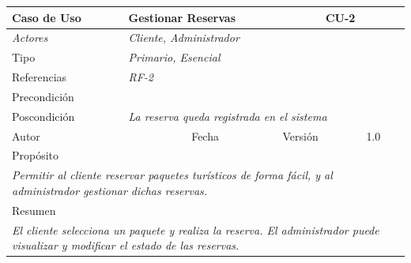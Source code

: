 \begin{table}[H]
\begin{tabular}{|llllllll|}
\hline
\multicolumn{1}{|l|}{\cellcolor[HTML]{F2F2F2}Caso de Uso} & \multicolumn{5}{l|}{Gestionar Reservas} & \multicolumn{2}{l|}{\cellcolor[HTML]{E6E6E6}CU-2} \\ \hline
\multicolumn{1}{|l|}{{\color[HTML]{808080} \textit{Actores}}} & \multicolumn{7}{l|}{{\color[HTML]{808080} \textit{Cliente, Administrador}}} \\ \hline
\multicolumn{1}{|l|}{Tipo} & \multicolumn{7}{l|}{{\color[HTML]{808080} \textit{Primario, Esencial}}} \\ \hline
\multicolumn{1}{|l|}{Referencias} & \multicolumn{2}{l|}{{\color[HTML]{808080} \textit{RF-2}}} & \multicolumn{5}{l|}{} \\ \hline
\multicolumn{1}{|l|}{Precondición} & \multicolumn{7}{l|}{} \\ \hline
\multicolumn{1}{|l|}{Poscondición} & \multicolumn{7}{l|}{{\color[HTML]{808080} \textit{La reserva queda registrada en el sistema}}} \\ \hline
\multicolumn{1}{|l|}{Autor} & \multicolumn{1}{l|}{} & \multicolumn{2}{l|}{Fecha} & \multicolumn{1}{l|}{} & \multicolumn{2}{l|}{Versión} & 1.0 \\ \hline
\multicolumn{8}{|l|}{Propósito} \\ \hline
\multicolumn{8}{|p{15cm}|}{{\color[HTML]{808080} \textit{Permitir al cliente reservar paquetes turísticos de forma fácil, y al administrador gestionar dichas reservas.}}} \\ \hline
\multicolumn{8}{|l|}{Resumen} \\ \hline
\multicolumn{8}{|p{15cm}|}{{\color[HTML]{808080} \textit{El cliente selecciona un paquete y realiza la reserva. El administrador puede visualizar y modificar el estado de las reservas.}}} \\ \hline
\end{tabular}
\end{table}

